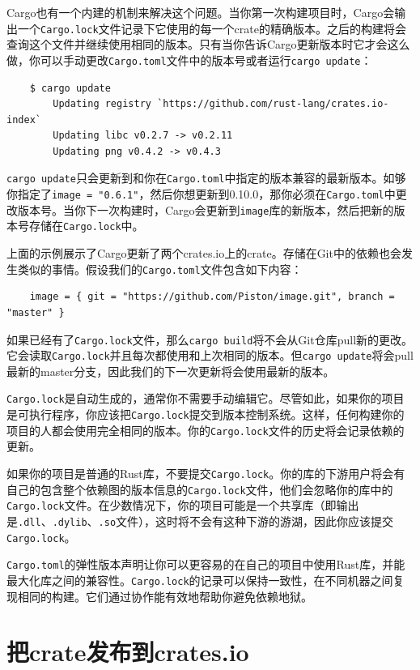 Cargo也有一个内建的机制来解决这个问题。当你第一次构建项目时，Cargo会输出一个\texttt{Cargo.lock}文件记录下它使用的每一个crate的精确版本。之后的构建将会查询这个文件并继续使用相同的版本。只有当你告诉Cargo更新版本时它才会这么做，你可以手动更改\texttt{Cargo.toml}文件中的版本号或者运行\texttt{cargo update}：
\begin{verbatim}
    $ cargo update
        Updating registry `https://github.com/rust-lang/crates.io-index`
        Updating libc v0.2.7 -> v0.2.11
        Updating png v0.4.2 -> v0.4.3
\end{verbatim}

\texttt{cargo update}只会更新到和你在\texttt{Cargo.toml}中指定的版本兼容的最新版本。如够你指定了\texttt{image = "0.6.1"}，然后你想更新到0.10.0，那你必须在\texttt{Cargo.toml}中更改版本号。当你下一次构建时，Cargo会更新到\texttt{image}库的新版本，然后把新的版本号存储在\texttt{Cargo.lock}中。

上面的示例展示了Cargo更新了两个crates.io上的crate。存储在Git中的依赖也会发生类似的事情。假设我们的\texttt{Cargo.toml}文件包含如下内容：
\begin{verbatim}
    image = { git = "https://github.com/Piston/image.git", branch = "master" }
\end{verbatim}

如果已经有了\texttt{Cargo.lock}文件，那么\texttt{cargo build}将不会从Git仓库pull新的更改。它会读取\texttt{Cargo.lock}并且每次都使用和上次相同的版本。但\texttt{cargo update}将会pull最新的master分支，因此我们的下一次更新将会使用最新的版本。

\texttt{Cargo.lock}是自动生成的，通常你不需要手动编辑它。尽管如此，如果你的项目是可执行程序，你应该把\texttt{Cargo.lock}提交到版本控制系统。这样，任何构建你的项目的人都会使用完全相同的版本。你的\texttt{Cargo.lock}文件的历史将会记录依赖的更新。

如果你的项目是普通的Rust库，不要提交\texttt{Cargo.lock}。你的库的下游用户将会有自己的包含整个依赖图的版本信息的\texttt{Cargo.lock}文件，他们会忽略你的库中的\texttt{Cargo.lock}文件。在少数情况下，你的项目可能是一个共享库（即输出是\texttt{.dll}、\texttt{.dylib}、\texttt{.so}文件），这时将不会有这种下游的游湖，因此你应该提交\texttt{Cargo.lock}。

\texttt{Cargo.toml}的弹性版本声明让你可以更容易的在自己的项目中使用Rust库，并能最大化库之间的兼容性。\texttt{Cargo.lock}的记录可以保持一致性，在不同机器之间复现相同的构建。它们通过协作能有效地帮助你避免依赖地狱。

\section{把crate发布到crates.io}

